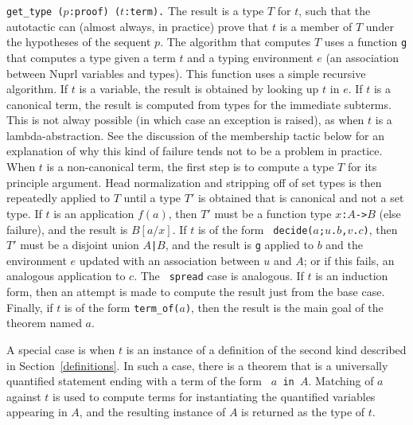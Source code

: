 {\tt get\_type ($p$:proof) ($t$:term).} The result
is a type $T$ for $t$, such that the autotactic can
(almost always, in practice) prove that $t$ is a
member of $T$ under the hypotheses of the sequent
$p$.  The algorithm that computes $T$ uses a
function {\tt g} that computes a type given a term
$t$ and a typing environment $e$ (an association
between Nuprl variables and types).  This function
uses a simple recursive algorithm.  If $t$ is a
variable, the result is obtained by looking up $t$
in $e$.  If $t$ is a canonical term, the result is
computed from types for the immediate subterms.
This is not alway possible (in which case an
exception is raised), as when $t$ is a
lambda-abstraction.  See the discussion of the
membership tactic below for an explanation of why
this kind of failure tends not to be a problem in
practice.  When $t$ is a non-canonical term, the
first step is to compute a type $T$ for its
principle argument.  Head normalization and
stripping off of set types is then repeatedly
applied to $T$ until a type $T'$ is obtained that
is canonical and not a set type.  If $t$ is an
application $f(a)$, then $T'$ must be a function
type {\tt $x$:$A$->$B$} (else failure), and the
result is $B[a/x]$.  If $t$ is of the form {\tt
decide($a$;$u$.$b$,$v$.$c$)}, then $T'$ must be a
disjoint union {\tt $A$|$B$}, and the result is {\tt g}
applied to $b$ and the environment $e$ updated with
an association between $u$ and $A$; or if this
fails, an analogous application to $c$.  The {\tt
spread} case is analogous.  If $t$ is an induction
form, then an attempt is made to compute the result
just from the base case.  Finally, if $t$ is of the
form {\tt term\_of($a$)}, then the result is the
main goal of the theorem named $a$.

A special case is when $t$ is an instance of a definition of the second kind
described in Section~\ref{definitions}.  In such a case, there is a theorem that
is a universally quantified statement ending with a term of the form {\tt
$a$~in~$A$}.  Matching of $a$ against $t$ is used to compute terms for
instantiating the quantified variables appearing in $A$, and the resulting
instance of $A$ is returned as the type of $t$.

